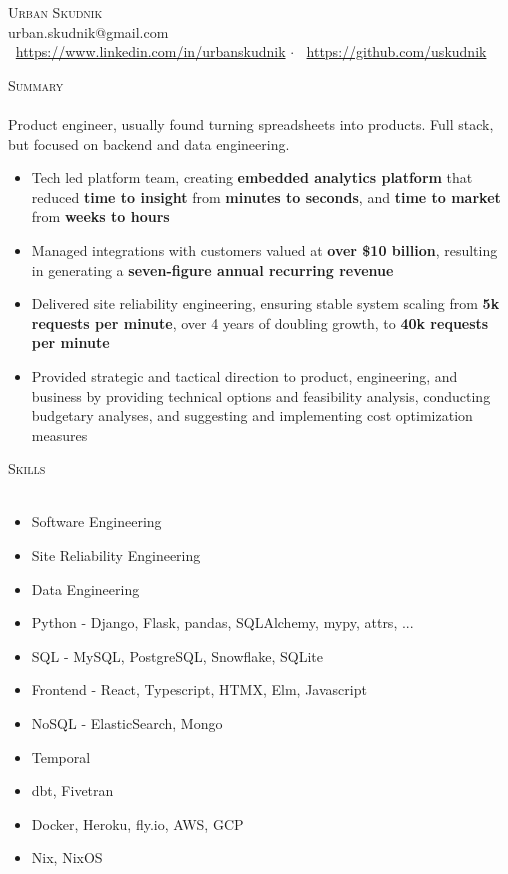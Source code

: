 \documentclass[a4paper]{article}
\newcommand{\lineunder} {
    \vspace*{-8pt} \\
    \hspace*{-18pt} {\color{Mahogany} \hrulefill} \\
}
\newcommand{\header} [1] {
    \vspace{4mm}
    {\hspace*{-18pt}\vspace*{6pt} \large \textsc{\textcolor{Mahogany}{#1}}}
    \vspace*{-6pt} \lineunder
}
\begin{document}
\vspace*{-40pt}



\vspace*{-10pt}
\begin{center}
	{\Huge \scshape {Urban Skudnik}}\\
    \vspace{2mm}
	urban.skudnik@gmail.com\\
    \vspace{2mm}
    \faLinkedinSquare  $\>$ \url{https://www.linkedin.com/in/urbanskudnik} $\cdot$
    \faGithub $\>$ \url{https://github.com/uskudnik}\\
\end{center}

\header{Summary}
Product engineer, usually found turning spreadsheets into products. Full stack, but focused on backend and data engineering.

\begin{itemize} \itemsep 1pt
\item Tech led platform team, creating \textbf{embedded analytics platform} that reduced \textbf{time to insight} from \textbf{minutes to seconds}, and \textbf{time to market} from \textbf{weeks to hours}
\item Managed integrations with customers valued at \textbf{over \$10 billion}, resulting in generating a \textbf{seven-figure annual recurring revenue}
\item Delivered site reliability engineering, ensuring stable system scaling from \textbf{5k requests per minute}, over 4 years of doubling growth, to \textbf{40k requests per minute}
\item Provided strategic and tactical direction to product, engineering, and business by providing technical options and feasibility analysis, conducting budgetary analyses, and suggesting and implementing cost optimization measures
\end{itemize}


\header{Skills}
\begin{itemize} \itemsep 1pt
    \item Software Engineering
    \item Site Reliability Engineering
    \item Data Engineering
    \item Python - Django, Flask, pandas, SQLAlchemy, mypy, attrs, ...
    \item SQL - MySQL, PostgreSQL, Snowflake, SQLite
    \item Frontend - React, Typescript, HTMX, Elm, Javascript
    \item NoSQL - ElasticSearch, Mongo
    \item Temporal
    \item dbt, Fivetran
    \item Docker, Heroku, fly.io, AWS, GCP
    \item Nix, NixOS
\end{itemize}
\end{document}
